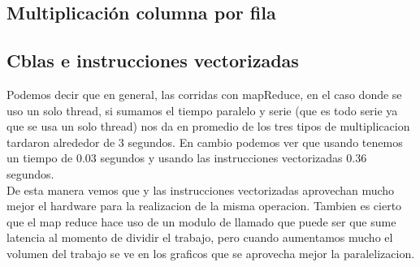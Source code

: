 \subsection{Multiplicación columna por fila}

    \def\model{ColumnByRow}
    \def\analisisAmdahl{
    Podemos observar que el speed up teórico tiende al máximo speed-up
    mientras que el real nos muestra que no usa toda la paralelizacion ya que al
    pasar de 1 a 2 threads, el tiempo no cae a la mitad, y al pasar de 1 a 4 threads
    tampoco. Se puede ver que tiene un speed-up de casi 2 lo cual quiere decir que
    hace uso de la mitad.
    }
    \def\analisisGustafson{
    Podemos ver que estos resultados demuestran que la sección serie del
    problema se mantiene casi constante respecto de la sección paralela
    que varía en forma ascendente con el tamaño de los datos de entrada.
    Pero además podemos observar que hay mucha ineficiencia respecto del uso de
    la paralelización ya que al aumentar el trabajo en casi el doble usando
    dos procesadores debería tardar aproximadamente lo mismo. Sin embargo vemos
    que el tiempo paralelo se duplicó, lo cual muestra que hay un problema de
    comunicación al aumentar el paralelismo. Mas adelante explicaremos que el
    módulo Pool es ineficiente respecto del uso de recursos
    }
    
    \newpage
    \clearpage

\subsection{Cblas e instrucciones vectorizadas}
    \def\text{Tiempo serie de multiplicacion en segundos}
    \def\path{dgemm.png}
    \def\scale{.6}
    

    Podemos decir que en general, las corridas con mapReduce, en el caso donde se
    uso un solo thread, si sumamos el tiempo paralelo y serie (que es todo serie
    ya que se usa un solo thread) nos da en promedio de los tres tipos de
    multiplicacion tardaron alrededor de 3 segundos. En cambio podemos ver que
    usando  tenemos un tiempo de 0.03 segundos y usando las
    instrucciones vectorizadas 0.36 segundos.\\
    De esta manera vemos que  y las instrucciones vectorizadas aprovechan
    mucho mejor el hardware para la realizacion de la misma operacion. Tambien es
    cierto que el map reduce hace uso de un modulo de  llamado
     que puede ser que sume latencia al momento de dividir el trabajo,
    pero cuando aumentamos mucho el volumen del trabajo se ve en los graficos que
    se aprovecha mejor la paralelizacion.

